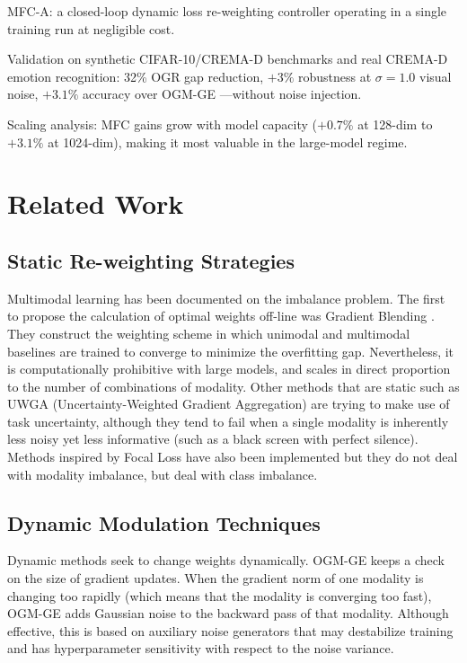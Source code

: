 \documentclass{ieeeaccess}
\begin{document}
MFC-A: a closed-loop dynamic loss re-weighting controller operating in a single training run at negligible cost.

Validation on synthetic CIFAR-10/CREMA-D benchmarks and real CREMA-D emotion recognition: 32\% OGR gap reduction, $+3\%$ robustness at $\sigma{=}1.0$ visual noise, $+3.1\%$ accuracy over OGM-GE \cite{peng2022balanced}---without noise injection.

Scaling analysis: MFC gains grow with model capacity ($+0.7\%$ at 128-dim to $+3.1\%$ at 1024-dim), making it most valuable in the large-model regime.

\section{Related Work}

\subsection{Static Re-weighting Strategies}
Multimodal learning has been documented on the imbalance problem. The first to propose the calculation of optimal weights off-line was Gradient Blending \cite{wang2020makes}. They construct the weighting scheme in which unimodal and multimodal baselines are trained to converge to minimize the overfitting gap. Nevertheless, it is computationally prohibitive with large models, and scales in direct proportion to the number of combinations of modality. Other methods that are static such as UWGA (Uncertainty-Weighted Gradient Aggregation) \cite{kendall2018multi} are trying to make use of task uncertainty, although they tend to fail when a single modality is inherently less noisy yet less informative (such as a black screen with perfect silence). Methods inspired by Focal Loss \cite{lin2017focal} have also been implemented but they do not deal with modality imbalance, but deal with class imbalance.

\subsection{Dynamic Modulation Techniques}
Dynamic methods seek to change weights dynamically. OGM-GE \cite{peng2022balanced} keeps a check on the size of gradient updates. When the gradient norm of one modality is changing too rapidly (which means that the modality is converging too fast), OGM-GE adds Gaussian noise to the backward pass of that modality. Although effective, this is based on auxiliary noise generators that may destabilize training and has hyperparameter sensitivity with respect to the noise variance.
\end{document}

